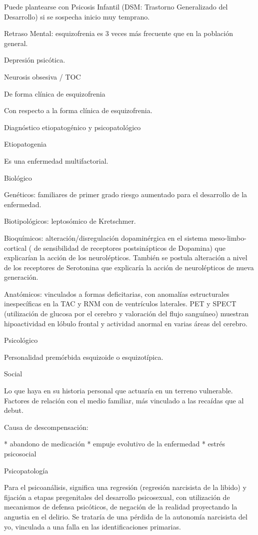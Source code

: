 \documentclass{scrbook}
\begin{document}
Puede plantearse con Psicosis Infantil (DSM: Trastorno Generalizado del Desarrollo) si se sospecha inicio muy temprano.

Retraso Mental: esquizofrenia es 3 veces más frecuente que en la población general.

Depresión psicótica.

Neurosis obsesiva / TOC

De forma clínica de esquizofrenia

Con respecto a la forma clínica de esquizofrenia.

Diagnóstico etiopatogénico y psicopatológico

Etiopatogenia

Es una enfermedad multifactorial.

Biológico

Genéticos: familiares de primer grado riesgo aumentado para el desarrollo de la enfermedad.

Biotipológicos: leptosómico de Kretschmer.

Bioquímicos: alteración/disregulación dopaminérgica en el sistema meso-limbo-cortical ( de sensibilidad de receptores postsinápticos de Dopamina) que explicarían la acción de los neurolépticos. También se postula alteración a nivel de los receptores de Serotonina que explicaría la acción de neurolépticos de nueva generación.

Anatómicos: vinculados a formas deficitarias, con anomalías estructurales inespecíficas en la TAC y RNM con de ventrículos laterales. PET y SPECT (utilización de glucosa por el cerebro y valoración del flujo sanguíneo) muestran hipoactividad en lóbulo frontal y actividad anormal en varias áreas del cerebro.

Psicológico

Personalidad premórbida esquizoide o esquizotípica.

Social

Lo que haya en su historia personal que actuaría en un terreno vulnerable. Factores de relación con el medio familiar, más vinculado a las recaídas que al debut.

Causa de descompensación:

* abandono de medicación
* empuje evolutivo de la enfermedad
* estrés psicosocial

Psicopatología

Para el psicoanálisis, significa una regresión (regresión narcisista de la libido) y fijación a etapas pregenitales del desarrollo psicosexual, con utilización de mecanismos de defensa psicóticos, de negación de la realidad proyectando la angustia en el delirio. Se trataría de una pérdida de la autonomía narcisista del yo, vinculada a una falla en las identificaciones primarias.
\end{document}
